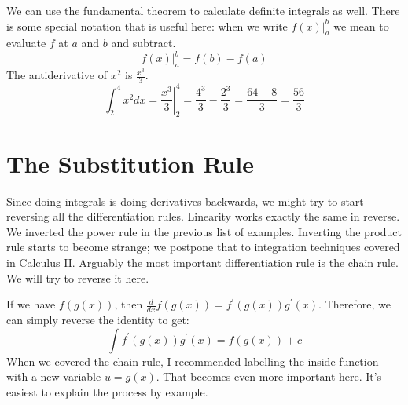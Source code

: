 \documentclass[fleqn]{report}
\begin{document}
\begin{example}
We can use the fundamental theorem to
calculate definite integrals as well. There is some special notation
that is useful here: when we write $\left. f(x)
\right|_a^b$ we mean to evaluate $f$ at $a$ and $b$ and
subtract. 
\begin{equation*}
\left. f(x) \right|_a^b = f(b) - f(a)
\end{equation*}
The antiderivative of $x^2$ is $\frac{x^3}{3}$.
\begin{equation*}
\int_2^4 x^2 dx = \left. \frac{x^3}{3} \right|_2^4 =
\frac{4^3}{3} - \frac{2^3}{3} = \frac{64 - 8}{3} = \frac{56}{3}
\end{equation*}
\end{example}

\chapter{The Substitution Rule}
\label{The Substitution Rule}

Since doing integrals is doing derivatives backwards, we might
try to start reversing all the differentiation rules.
Linearity works exactly the same in reverse.
We inverted the power rule in the previous list of
examples. Inverting the product rule starts to become
strange; we postpone that to integration techniques covered in
Calculus II. Arguably the most important differentiation rule is
the chain rule. We will try to reverse it here.

If we have $f(g(x))$, then $\frac{d}{dx} f(g(x)) =
f^\prime(g(x)) g^\prime(x)$. Therefore, we can simply reverse
the identity to get: 
\begin{equation*}
\int f^\prime(g(x)) g^\prime(x) = f(g(x)) + c
\end{equation*}
When we covered the chain rule, I recommended labelling the inside
function with a new variable $u = g(x)$. That becomes even
more important here. It's easiest to explain the process by
example.
\end{document}
